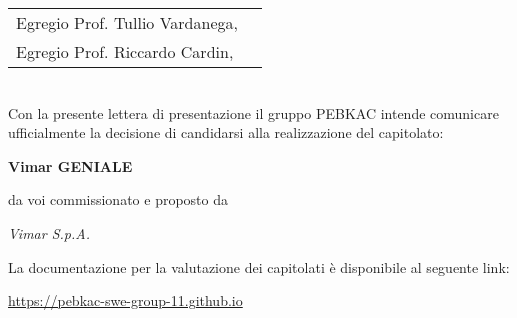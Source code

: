 \documentclass[12pt, a4paper]{article}
\begin{document}

\begin{tabular}{@{}l l@{}}
  Egregio Prof. Tullio Vardanega, &  \\Egregio Prof. Riccardo Cardin,
\end{tabular}
\\

Con la presente lettera di presentazione il gruppo PEBKAC intende comunicare ufficialmente la decisione di candidarsi alla realizzazione del capitolato:

{\huge\begin{center}\textbf{Vimar GENIALE}\end{center}}

da voi commissionato e proposto da 
{\begin{center}\textit{Vimar S.p.A.}\end{center}}
La documentazione per la valutazione dei capitolati è disponibile al seguente link:

\begin{center}
\href{https://pebkac-swe-group-11.github.io}{https://pebkac-swe-group-11.github.io}
\end{center}
\end{document}
